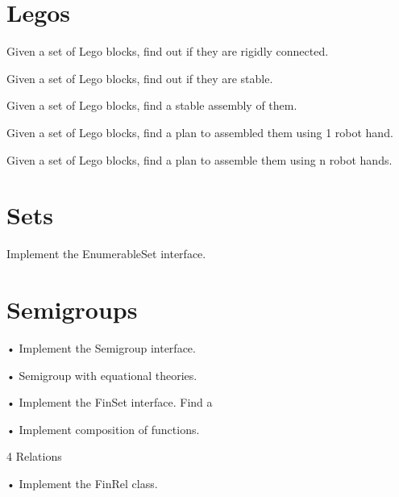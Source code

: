 \documentclass[paper=6in:9in,pagesize=pdftex,%
  headinclude=false,footinclude=false,10pt,twoside,egregdoesnotlikesansseriftitles]{scrbook}
\begin{document}
\section{Legos}

Given a set of Lego blocks, find out if they are rigidly connected.

Given a set of Lego blocks, find out if they are stable.

Given a set of Lego blocks, find a stable assembly of them.

 Given a set of Lego blocks, find a plan to assembled them using 1 robot hand.

Given a set of Lego blocks, find a plan to assemble them using n robot hands.

\section{Sets}

Implement the EnumerableSet interface.


\section{Semigroups}

• Implement the Semigroup interface.

• Semigroup with equational theories.

• Implement the FinSet interface. Find a

• Implement composition of functions.

4 Relations

• Implement the FinRel class.

  
\end{document}
